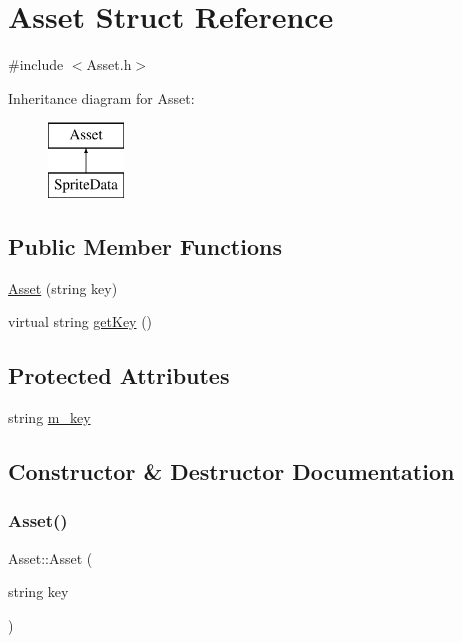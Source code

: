 \hypertarget{struct_asset}{}\section{Asset Struct Reference}
\label{struct_asset}


{\ttfamily \#include $<$Asset.\+h$>$}

Inheritance diagram for Asset\+:\begin{figure}[H]
\begin{center}
\leavevmode
\includegraphics[height=2.000000cm]{struct_asset}
\end{center}
\end{figure}
\subsection*{Public Member Functions}
\begin{DoxyCompactItemize}
\item 
\hyperlink{struct_asset_ab6f3eef3374ddf89913a089e88683ccc}{Asset} (string key)
\item 
virtual string \hyperlink{struct_asset_acadc9dc60e4a89d711de110327df094c}{get\+Key} ()
\end{DoxyCompactItemize}
\subsection*{Protected Attributes}
\begin{DoxyCompactItemize}
\item 
string \hyperlink{struct_asset_abc299be0e567c1c57a545ddc12a2e9dc}{m\+\_\+key}
\end{DoxyCompactItemize}


\subsection{Constructor \& Destructor Documentation}
\hypertarget{struct_asset_ab6f3eef3374ddf89913a089e88683ccc}{}\label{struct_asset_ab6f3eef3374ddf89913a089e88683ccc} 
\subsubsection{\texorpdfstring{Asset()}{Asset()}}
{\footnotesize\ttfamily Asset\+::\+Asset (\begin{DoxyParamCaption}\item[{string}]{key }\end{DoxyParamCaption})\hspace{0.3cm}{\ttfamily [inline]}}



